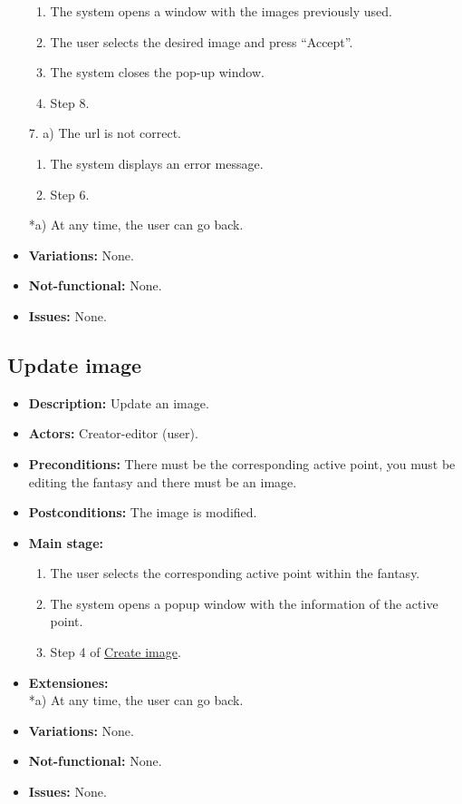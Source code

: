 \begin{itemize}
\begin{enumerate}
		\item The system opens a window with the images previously used.
		\item The user selects the desired image and press ``Accept''.
		\item The system closes the pop-up window.
		\item Step 8.
	\end{enumerate}
	7. a) The url is not correct.
	\begin{enumerate}
		\item The system displays an error message.
		\item Step 6.
	\end{enumerate}
	*a) At any time, the user can go back.
	\item \textbf{Variations:} None.
	\item \textbf{Not-functional:} None.
	\item \textbf{Issues:} None. %
\end{itemize}

\subsection{Update image}
\begin{itemize}
	\item \textbf{Description:} Update an image.
	\item \textbf{Actors:} Creator-editor (user).
	\item \textbf{Preconditions:} There must be the corresponding active point, you must be editing the fantasy and there must be an image.
	\item \textbf{Postconditions:} The image is modified.
	\item \textbf{Main stage:}
	\begin{enumerate}
		\item The user selects the corresponding active point within the fantasy.
		\item The system opens a popup window with the information of the active point.
		\item Step 4 of \hyperlink{crearimagen}{Create image}.
	\end{enumerate}
	\item \textbf{Extensiones:} \\ *a) At any time, the user can go back.
	\item \textbf{Variations:} None.
	\item \textbf{Not-functional:} None.
	\item \textbf{Issues:} None.
\end{itemize}

